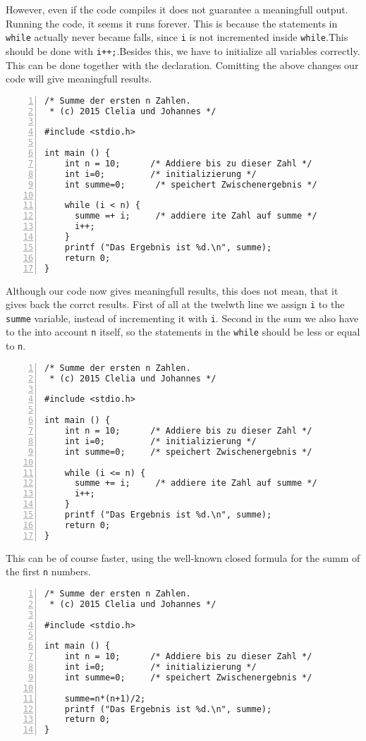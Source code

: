 \documentclass{article}[12pt]
\newenvironment{codelisting}{\fontfamily{pcr}\selectfont%
\lstset{commentstyle=\textit}\lstset{language=c}}{\fontfamily{ptm}\selectfont}
\begin{document}
However, even if the code compiles it does not guarantee a meaningfull output. Running the code, it seems it runs
forever. This is because the statements in \texttt{while} actually never became falls, since \texttt{i} is not incremented
inside \texttt{while}.This should be done with \texttt{i++;}.Besides this, we have to initialize all variables correctly. 
This can be done together with the declaration. Comitting the above changes our code will give meaningfull results.
\begin{codelisting}
\begin{lstlisting}[numbers=left,numberstyle=\tiny,frame=tlrb,showstringspaces=false]
/* Summe der ersten n Zahlen.
 * (c) 2015 Clelia und Johannes */

#include <stdio.h>

int main () {
    int n = 10;      /* Addiere bis zu dieser Zahl */
    int i=0;         /* initializierung */
    int summe=0;      /* speichert Zwischenergebnis */

    while (i < n) {
      summe =+ i;     /* addiere ite Zahl auf summe */
      i++;
    }
    printf ("Das Ergebnis ist %d.\n", summe);
    return 0;
}
\end{lstlisting}
\end{codelisting}
Although our code now gives meaningfull results, this does not mean, that it gives back the corrct results. First of all
at the twelwth line we assign \texttt{i} to the \texttt{summe} variable, instead of incrementing it with \texttt{i}. Second
in the sum we also have to the into account \texttt{n} itself, so the statements in the \texttt{while} should be less or equal
to \texttt{n}.
\begin{codelisting}
\begin{lstlisting}[numbers=left,numberstyle=\tiny,frame=tlrb,showstringspaces=false]
/* Summe der ersten n Zahlen.
 * (c) 2015 Clelia und Johannes */

#include <stdio.h>

int main () {
    int n = 10;      /* Addiere bis zu dieser Zahl */
    int i=0;         /* initializierung */
    int summe=0;     /* speichert Zwischenergebnis */

    while (i <= n) {
      summe += i;     /* addiere ite Zahl auf summe */
      i++;
    }
    printf ("Das Ergebnis ist %d.\n", summe);
    return 0;
}
\end{lstlisting}
\end{codelisting}
This can be of course faster, using the well-known closed formula for the summ of the first \texttt{n} numbers.
\begin{codelisting}
\begin{lstlisting}[numbers=left,numberstyle=\tiny,frame=tlrb,showstringspaces=false]
/* Summe der ersten n Zahlen.
 * (c) 2015 Clelia und Johannes */

#include <stdio.h>

int main () {
    int n = 10;      /* Addiere bis zu dieser Zahl */
    int i=0;         /* initializierung */
    int summe=0;     /* speichert Zwischenergebnis */

    summe=n*(n+1)/2;
    printf ("Das Ergebnis ist %d.\n", summe);
    return 0;
}
\end{lstlisting}
\end{codelisting}
\end{document}
